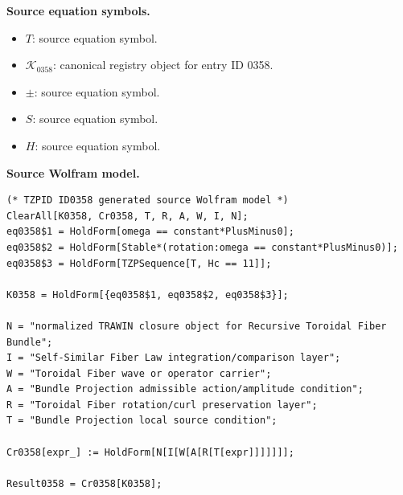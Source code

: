 \begin{minipage}[t]{0.49\linewidth}
\begingroup
\small
\raggedright
\textbf{Source equation symbols.}\par
\begin{itemize}[leftmargin=1.35em,itemsep=1pt,topsep=1pt,parsep=0pt]
    \item $T$: source equation symbol.
    \item $\mathcal{K}_{0358}$: canonical registry object for entry ID 0358.
    \item $\pm$: source equation symbol.
    \item $S$: source equation symbol.
    \item $H$: source equation symbol.
\end{itemize}
\endgroup
\end{minipage}\hfill
\begin{minipage}[t]{0.47\linewidth}
\begingroup
\scriptsize
\raggedright
\textbf{Source Wolfram model.}\par
\begin{Verbatim}[fontsize=\tiny,breaklines=true,breakanywhere=true]
(* TZPID ID0358 generated source Wolfram model *)
ClearAll[K0358, Cr0358, T, R, A, W, I, N];
eq0358$1 = HoldForm[omega == constant*PlusMinus0];
eq0358$2 = HoldForm[Stable*(rotation:omega == constant*PlusMinus0)];
eq0358$3 = HoldForm[TZPSequence[T, Hc == 11]];

K0358 = HoldForm[{eq0358$1, eq0358$2, eq0358$3}];

N = "normalized TRAWIN closure object for Recursive Toroidal Fiber Bundle";
I = "Self-Similar Fiber Law integration/comparison layer";
W = "Toroidal Fiber wave or operator carrier";
A = "Bundle Projection admissible action/amplitude condition";
R = "Toroidal Fiber rotation/curl preservation layer";
T = "Bundle Projection local source condition";

Cr0358[expr_] := HoldForm[N[I[W[A[R[T[expr]]]]]]];

Result0358 = Cr0358[K0358];
\end{Verbatim}
\endgroup
\end{minipage}

